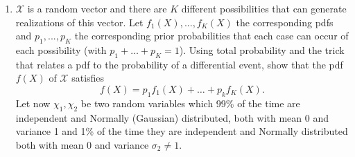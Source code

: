 \documentclass[letter, 12pt]{article}
\begin{document}
\begin{enumerate}[wide = 0pt, label = \textbf{Problem \arabic*:}]
\begin{subquestion}
		\end{subquestion}
	
		\item {$ \mathcal{X} $ is a random vector and there are $ K $ different possibilities that can generate realizations of this
			vector. Let $ f_1 (X), . . . , f_K (X) $ the corresponding pdfs and $ p_1 , . . . , p_K $ the corresponding prior probabilities
			that each case can occur of each possibility (with $ p_1 + \dots + p_K = 1 $). Using total probability and the trick
			that relates a pdf to the probability of a differential event, show that the pdf $ f (X) $ of $ \mathcal{X} $ satisfies \[ f(X) = p_1 f_1 (X) + \dots + p_k f_K (X). \] Let now $ \chi_1 , \chi_2 $ be two random variables which 99\% of the time are independent and Normally (Gaussian)
			distributed, both with mean 0 and variance 1 and 1\% of the time they are independent and Normally
			distributed both with mean 0 and variance $ \sigma_2 \ne 1 $.}
\end{enumerate}
\end{document}
